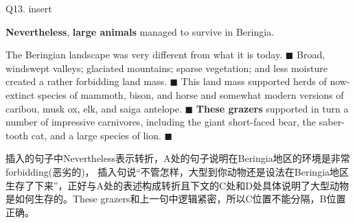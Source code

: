 \begin{blk}
    \begin{qst}
        Q13. insert
    \end{qst}

    \begin{chc}
        \textbf{Nevertheless}, \textbf{large animals} managed to survive in Beringia.
    \end{chc}

    \begin{psgq}
        The Beringian landscape was very different from what it is today. $\blacksquare$ Broad, windswept valleys; glaciated mountains; sparse vegetation; and less moisture created a rather forbidding land mass. $\blacksquare$ This land mass supported herds of now-extinct species of mammoth, bison, and horse and somewhat modern versions of caribou, musk ox, elk, and saiga antelope. $\blacksquare$ \textbf{These grazers} supported in turn a number of impressive carnivores, including the giant short-faced bear, the saber-tooth cat, and a large species of lion. $\blacksquare$
    \end{psgq}

    \begin{nlz}
        插入的句子中Nevertheless表示转折，A处的句子说明在Beringia地区的环境是非常forbidding(恶劣的)， 插入句说“不管怎样，大型到你动物还是设法在Beringia地区生存了下来”，正好与A处的表述构成转折且下文的C处和D处具体说明了大型动物是如何生存的。These grazers和上一句中逻辑紧密，所以C位置不能分隔，B位置正确。
    \end{nlz}
\end{blk}
